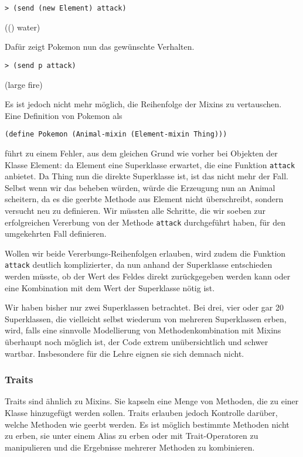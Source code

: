 \begin{lstlisting}
> (send (new Element) attack)
\end{lstlisting}
{\rsymbol (() water)}

Dafür zeigt Pokemon nun das gewünschte Verhalten.
\begin{lstlisting}
> (send p attack)
\end{lstlisting}
{\rsymbol (large fire)}

Es ist jedoch nicht mehr möglich, die Reihenfolge der Mixins zu vertauschen. Eine Definition von Pokemon als

\begin{lstlisting}
(define Pokemon (Animal-mixin (Element-mixin Thing)))
\end{lstlisting}

führt zu einem Fehler, aus dem gleichen Grund wie vorher bei Objekten der Klasse Element: da Element eine Superklasse erwartet, die eine Funktion \texttt{attack} anbietet. Da Thing nun die direkte Superklasse ist, ist das nicht mehr der Fall. Selbst wenn wir das beheben würden, würde die Erzeugung nun an Animal scheitern, da es die geerbte Methode aus Element nicht überschreibt, sondern versucht neu zu definieren. Wir müssten alle Schritte, die wir soeben zur erfolgreichen Vererbung von der Methode \texttt{attack} durchgeführt haben, für den umgekehrten Fall definieren. 

Wollen wir beide Vererbungs-Reihenfolgen erlauben, wird zudem die Funktion \texttt{attack} deutlich komplizierter, da nun anhand der Superklasse entschieden werden müsste, ob der Wert des Feldes direkt zurückgegeben werden kann oder eine Kombination mit dem Wert der Superklasse nötig ist.

Wir haben bisher nur zwei Superklassen betrachtet. Bei drei, vier oder gar 20 Superklassen, die vielleicht selbst wiederum von mehreren Superklassen erben, wird, falls eine sinnvolle Modellierung von Methodenkombination mit Mixins überhaupt noch möglich ist, der Code extrem unübersichtlich und schwer wartbar. Insbesondere für die Lehre eignen sie sich demnach nicht.

\subsubsection{Traits}
Traits sind ähnlich zu Mixins. Sie kapseln eine Menge von Methoden, die zu einer Klasse hinzugefügt werden sollen. Traits erlauben jedoch Kontrolle darüber, welche Methoden wie geerbt werden. Es ist möglich bestimmte Methoden nicht zu erben, sie unter einem Alias zu erben oder mit Trait-Operatoren zu manipulieren und die Ergebnisse mehrerer Methoden zu kombinieren.

